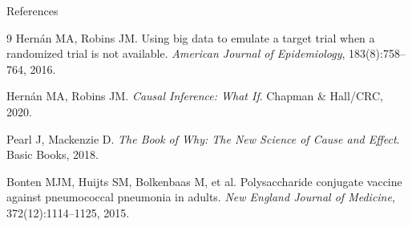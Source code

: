 \documentclass[aspectratio=169]{beamer}
\begin{document}
\begin{frame}[allowframebreaks]{References}
  \tiny
  
  \begin{thebibliography}{9}
    Hern{\'a}n MA, Robins JM.
    \newblock Using big data to emulate a target trial when a randomized trial is not available.
    \newblock \textit{American Journal of Epidemiology}, 183(8):758--764, 2016.

    Hern{\'a}n MA, Robins JM.
    \newblock \textit{Causal Inference: What If}.
    \newblock Chapman \& Hall/CRC, 2020.

    Pearl J, Mackenzie D.
    \newblock \textit{The Book of Why: The New Science of Cause and Effect}.
    \newblock Basic Books, 2018.

    Bonten MJM, Huijts SM, Bolkenbaas M, et al.
    \newblock Polysaccharide conjugate vaccine against pneumococcal pneumonia in adults.
    \newblock \textit{New England Journal of Medicine}, 372(12):1114--1125, 2015.
  \end{thebibliography}
\end{frame}
\end{document}
